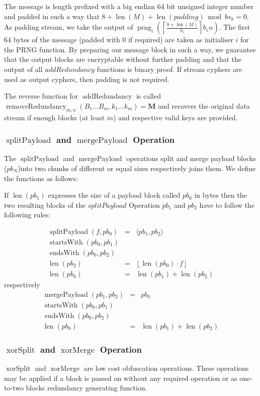 \documentclass[9pt,journal,compsoc]{IEEEtran}
\DeclareMathOperator{\prng}{prng}
\DeclareMathOperator{\len}{len}
\DeclareMathOperator{\xorSplit}{xorSplit}
\DeclareMathOperator{\xorMerge}{xorMerge}
\DeclareMathOperator{\splitPayload}{splitPayload}
\DeclareMathOperator{\mergePayload}{mergePayload}
\DeclareMathOperator{\startsWith}{startsWith}
\DeclareMathOperator{\lendsWith}{endsWith}
\DeclareMathOperator{\addRedundancy}{addRedundancy}
\DeclareMathOperator{\removeRedundancy}{removeRedundancy}
\begin{document}
The message is length prefixed with a big endian 64 bit unsigned integer number and padded in such a way that $8+\len(M)+\len(padding) \bmod bs_k =0$. As padding stream, we take the output of $\prng_i\left(\left\lceil\frac{8+\len(M)}{b_s}\right\rceil b_s n\right )$. The first 64 bytes of the message (padded with 0 if required) are taken as initialiser $i$ for the PRNG function. By preparing our message block in such a way, we guarantee that the output blocks are encryptable without further padding and that the output of all $addRedundancy$ functions is binary proof. If stream cyphers are used as output cyphers, then padding is not required.

The reverse function for $\addRedundancy$ is called $\removeRedundancy_{m,n}(B_1\ldots B_{m},k_1\ldots k_{m})=\mathbf{M}$ and recovers the original data stream if enough blocks (at least $m$) and respective valid keys are provided. 

\subsubsection{$\splitPayload$ and $\mergePayload$ Operation}
The $\splitPayload$ and $\mergePayload$ operations split and merge payload blocks ($pb_N$)into two chunks of different or equal sizes respectively joins them. We define the functions as follows:

If $\len(pb_1)$ expresses the size of a payload block called $pb_0$ in bytes then the two resulting blocks of the $splitPayload$ Operation $pb_1$ and $pb_2$ have to follow the following rules:

\begin{eqnarray}
\splitPayload(f, pb_0) & = &\langle pb_1, pb_2 \rangle\\
\startsWith(pb_0, pb_1)\\
\lendsWith(pb_0, pb_2)\\
\len(pb_2) & = & \left\lfloor \len(pb_0)\cdot f\right \rfloor\\
\len(pb_0) & = & \len(pb_1) + \len(pb_2)
\end{eqnarray}
respectively
\begin{eqnarray}
\mergePayload(pb_1, pb_2) & = & pb_0 \\
\startsWith(pb_0, pb_1)\\
\lendsWith(pb_0, pb_2)\\
\len(pb_0) & = & \len(pb_1) + \len(pb_2)
\end{eqnarray}
 
\subsubsection{$\xorSplit$ and $\xorMerge$ Operation}
$\xorSplit$ and $\xorMerge$ are low cost obfuscation operations. These operations may be applied if a block is passed on without any required operation or as one-to-two blocks redundancy generating function. 
\end{document}
